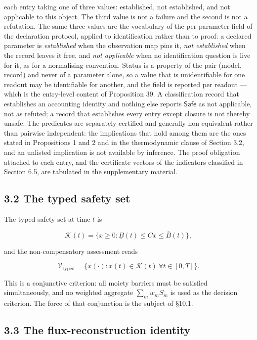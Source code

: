 \documentclass[11pt]{article}
\begin{document}
 each entry taking one of three values: established, not established, and not applicable to this object. The third value is not a failure and the second is not a refutation. The same three values are the vocabulary of the per-parameter field of the declaration protocol, applied to identification rather than to proof: a declared parameter is \emph{established} when the observation map pins it, \emph{not established} when the record leaves it free, and \emph{not applicable} when no identification question is live for it, as for a normalising convention. Status is a property of the pair (model, record) and never of a parameter alone, so a value that is unidentifiable for one readout may be identifiable for another, and the field is reported per readout --- which is the entry-level content of Proposition 39. A classification record that establishes an accounting identity and nothing else reports \(\mathsf{Safe}\) as not applicable, not as refuted; a record that establishes every entry except closure is not thereby unsafe. The predicates are separately certified and generally non-equivalent rather than pairwise independent: the implications that hold among them are the ones stated in Propositions 1 and 2 and in the thermodynamic clause of Section 3.2, and an unlisted implication is not available by inference. The proof obligation attached to each entry, and the certificate vectors of the indicators classified in Section 6.5, are tabulated in the supplementary material.

\subsection*{3.2 The typed safety set}\label{32-the-typed-safety-set}

The typed safety set at time \(t\) is 

$$\mathcal{K}(t) = \{ x \ge 0 : \underline{B}(t) \le Cx \le \overline{B}(t) \},$$

 and the non-compensatory assessment reads 

$$\mathcal{V}_{\mathrm{typed}} = \{ x(\cdot) : x(t) \in \mathcal{K}(t)\ \forall t \in [0,T] \}.$$

 This is a conjunctive criterion: all moiety barriers must be satisfied simultaneously, and no weighted aggregate \(\sum_m w_m S_m\) is used as the decision criterion. The force of that conjunction is the subject of \S10.1.

\subsection*{3.3 The flux-reconstruction identity}\label{33-the-flux-reconstruction-identity}
\end{document}

